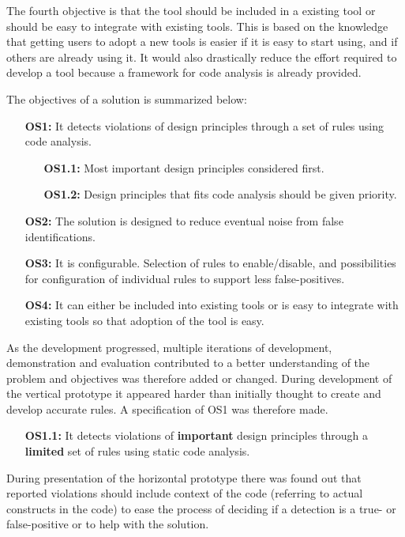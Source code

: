 \documentclass{report}
\begin{document}
The fourth objective is that the tool should be included in a existing tool or should be easy to integrate with existing tools. This is based on the knowledge that getting users to adopt a new tools is easier if it is easy to start using, and if others are already using it. It would also drastically reduce the effort required to develop a tool because a framework for code analysis is already provided. 

The objectives of a solution is summarized below:
\begin{itemize}
    \item [\textbf{OS1:}] It detects violations of design principles through a set of rules using code analysis.
    \begin{itemize}
        \item [\textbf{OS1.1:}] Most important design principles considered first.
        \item [\textbf{OS1.2:}] Design principles that fits code analysis should be given priority.
    \end{itemize}
    \item [\textbf{OS2:}] The solution is designed to reduce eventual noise from false identifications. 
    
    \item [\textbf{OS3:}] It is configurable. Selection of rules to enable/disable, and possibilities for configuration of individual rules to support less false-positives.  
    
    \item [\textbf{OS4:}] It can either be included into existing tools or is easy to integrate with existing tools so that adoption of the tool is easy.
\end{itemize}

As the development progressed, multiple iterations of development, demonstration and evaluation contributed to a better understanding of the problem and objectives was   therefore added or changed. During development of the vertical prototype it appeared harder than initially thought to create and develop accurate rules. A specification of OS1 was therefore made. 

\begin{itemize}
    \item [\textbf{OS1.1:}] It detects violations of \textbf{important} design principles through a \textbf{limited} set of rules using static code analysis.
\end{itemize}

During presentation of the horizontal prototype there was found out that reported violations should include context of the code (referring to actual constructs in the code) to ease the process of deciding if a detection is a true- or false-positive or to help with the solution. 
\end{document}
